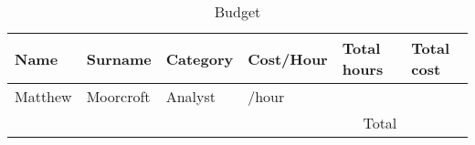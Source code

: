 \begin{table}
{\begin{tabular}{|l|l|l|l|l|l|l|}
		\hline
		\rowcolor[rgb]{0.753,0.753,0.753} Name~                         & Surname   & Category & Cost/Hour & Total hours       & \multicolumn{2}{l|}{Total cost}  \\ 
		\hline
		Matthew                                                         & Moorcroft & Analyst  & /hour   &                   &              &                   \\ 
		\hline
		\multicolumn{5}{|r|}{{\cellcolor{cyan}}Total}                                                                          & \multicolumn{2}{l|}{}            \\
		\hline
	\end{tabular}}
	\label{costs}
	\caption{Budget}
\end{table}